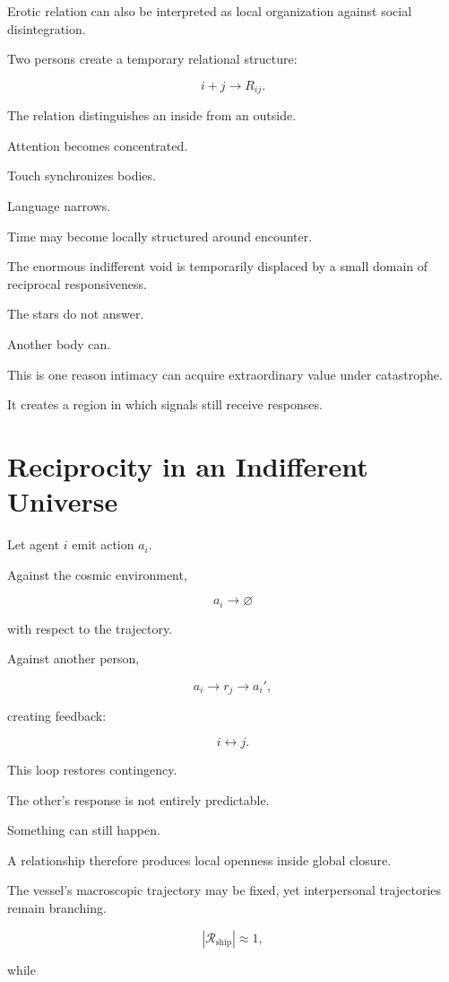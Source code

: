 \documentclass[11pt,oneside]{book}
\theoremstyle{definition}
\theoremstyle{remark}
\newcommand{\R}{\mathcal{R}}
\begin{document}
Erotic relation can also be interpreted as local organization against social disintegration.

Two persons create a temporary relational structure:

\[
i+j\rightarrow R_{ij}.
\]

The relation distinguishes an inside from an outside.

Attention becomes concentrated.

Touch synchronizes bodies.

Language narrows.

Time may become locally structured around encounter.

The enormous indifferent void is temporarily displaced by a small domain of reciprocal responsiveness.

The stars do not answer.

Another body can.

This is one reason intimacy can acquire extraordinary value under catastrophe.

It creates a region in which signals still receive responses.

\section{Reciprocity in an Indifferent Universe}

Let agent \(i\) emit action \(a_i\).

Against the cosmic environment,

\[
a_i
\rightarrow
\varnothing
\]

with respect to the trajectory.

Against another person,

\[
a_i
\rightarrow
r_j
\rightarrow
a_i',
\]

creating feedback:

\[
i
\leftrightarrow
j.
\]

This loop restores contingency.

The other's response is not entirely predictable.

Something can still happen.

A relationship therefore produces local openness inside global closure.

The vessel's macroscopic trajectory may be fixed, yet interpersonal trajectories remain branching.

\[
|\R_{\mathrm{ship}}|
\approx1,
\]

while
\end{document}
